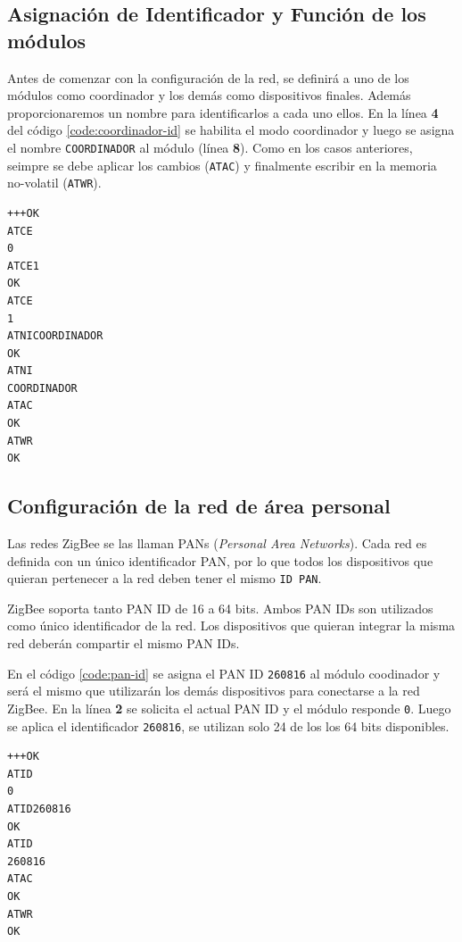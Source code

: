 \documentclass[11pt,oneside,spanish,a4paper]{article}
\begin{document}
\subsection[Nombre y Funcionalidad]{Asignación de Identificador y Función de los módulos}

Antes de comenzar con la configuración de la red, se definirá a uno de
los módulos como coordinador y los demás como dispositivos
finales. Además proporcionaremos un nombre para identificarlos a cada
uno ellos. En la línea \textbf{4} del código
\ref{code:coordinador-id}  se habilita el modo coordinador y luego se
asigna el nombre \texttt{COORDINADOR} al módulo (línea \textbf{8}).
 Como en los casos anteriores, seimpre se debe aplicar los cambios (\texttt{ATAC}) y
finalmente escribir en la memoria no-volatil (\texttt{ATWR}).
\begin{lstlisting}[emph={+++,ATCE,ATCE1,ATWR,ATAC,ATNI,ATCOORDINADOR},
    emphstyle={\color{blue}}, caption={Obtención del \textsl{seral
number}.}, label=code:coordinador-id]
+++OK
ATCE
0
ATCE1
OK
ATCE
1
ATNICOORDINADOR
OK
ATNI
COORDINADOR
ATAC
OK
ATWR
OK
\end{lstlisting}  

\subsection[Configuración PAN]{Configuración de la red de área personal}

Las redes ZigBee se las llaman PANs (\textsl{Personal Area
  Networks}). Cada red es definida con un único identificador PAN, por
lo que todos los dispositivos que quieran pertenecer a la red deben
tener el mismo \texttt{ID PAN}. 

ZigBee soporta tanto PAN ID de 16 a 64 bits. Ambos PAN IDs son
utilizados como único identificador de la red. Los dispositivos que
quieran integrar la misma red deberán compartir el mismo PAN IDs. 

En el código \ref{code:pan-id} se asigna el PAN ID \texttt{260816} al
módulo coodinador y será el mismo que utilizarán los demás
dispositivos para conectarse a la red ZigBee. En la línea \textbf{2}
se solicita el actual PAN ID y el módulo responde \texttt{0}. Luego se
aplica el identificador \texttt{260816}, se utilizan solo 24 de los
los 64 bits disponibles. 

\begin{lstlisting}[emph={+++,ATWR,ATAC,ATID,ATID260816},
    emphstyle={\color{blue}}, caption={Obtención del \textsl{serial
number}.}, label=code:pan-id]
+++OK
ATID
0
ATID260816
OK
ATID
260816
ATAC
OK
ATWR
OK
\end{lstlisting}  
\end{document}
